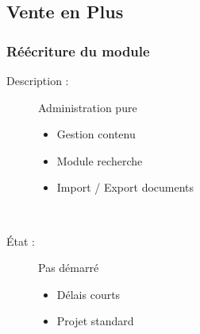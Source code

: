 \subsection{Vente en Plus}

\begin{frame}
	\frametitle{Réécriture du module}

	\begin{description}
		\item[Description :] Administration pure
			\begin{itemize}
				\item Gestion contenu\sautligne

				\item Module recherche
				\item Import / Export documents
			\end{itemize}~

		\item[État : ] Pas démarré
			\begin{itemize}
				\item Délais courts
				\item Projet \og standard \fg
			\end{itemize}
	\end{description}
\end{frame}
